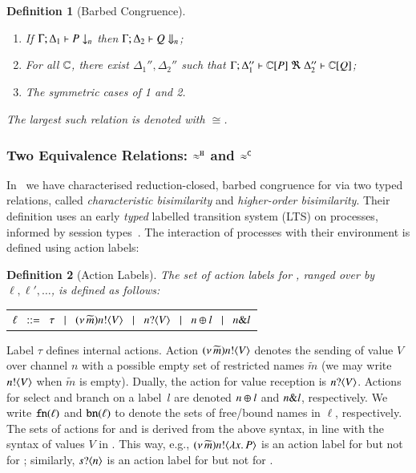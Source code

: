 \documentclass[preprint,11pt]{elsarticle}
\newtheorem{definition}{Definition}[section]
\begin{document}
{\begin{definition}[Barbed Congruence]
\begin{enumerate}[1.]
			\item	If $\Gamma;\Delta_1 \vdash P \downarrow_{n}$ then $\Gamma;\Delta_2 \vdash Q \Downarrow_{n}$; %


		\item	For all ${\mathbb{C}}$, there exist $\Delta_1'',\Delta_2''$ such that  $\horel{\Gamma}{\Delta_1''}{\context{\C}{P}}{\ \Re\ }{\Delta_2''}{\context{\C}{Q}}$;
		                      \item	The symmetric cases of 1 and 2.                
	\end{enumerate}
	The largest such relation is denoted with $\cong$.
\end{definition}

{
\subsubsection{Two Equivalence Relations: $\approx^\mathtt{H}$ and $\approx^\mathtt{C}$}\label{ss:equiv}
In~\cite{characteristic_bis,KouzapasPY17} we have characterised
reduction-closed, barbed congruence for \HOp
via two typed relations, called
{\em characteristic bisimilarity}
and 
\emph{higher-order bisimilarity}.
Their definition 
uses an early \emph{typed}
labelled transition system (LTS) on processes, informed by session
types~\cite{KY2015}. 
The interaction of processes with their environment is defined using action labels:
%
\begin{definition}[Action Labels]\label{d:labels}
The set of action labels for \HOp, ranged over by $\ell, \ell', \ldots$, is defined as follows:
\begin{center}
	\begin{tabular}{l}
		$\ell
			\;\;::=\;\;  \tau 
			\;\;\;|\;\;\;	(\nu\, \widetilde{m}) n ! \langle V \rangle
			\;\;\;|\;\;\;	n ? \langle V \rangle 
			\;\;\;|\;\;\;	n \oplus l 
			\;\;\;|\;\;\;	n \& l$
	\end{tabular}
\end{center}
\end{definition}
%
\noi 
Label $\tau$ defines internal actions.
Action
$(\nu\, \widetilde{m}) n ! \langle V \rangle$
denotes the sending of value $V$
over channel $n$ with a possible empty set of restricted names
$\widetilde{m}$ 
(we may write $n ! \langle V \rangle$ when $\widetilde{m}$ is empty).
Dually, the action for value reception is 
$n ? \langle V \rangle$.
Actions for select and branch on
a label~$l$ are denoted $n \oplus l$ and $n \& l$, respectively.
We write $\mathtt{fn}(\ell)$ and $\mathtt{bn}(\ell)$ to denote the
sets of free/bound names in $\ell$, respectively.
The sets of actions for \HO and \sessp is derived from the above syntax, in line with the syntax of values $V$ in .
This way, e.g., $(\nu\, \widetilde{m}) n ! \langle \lambda x.\,P \rangle$ is an action label for \HO but not for \sessp;
similarly, $s ? \langle n \rangle$ is an action label for \sessp but not for \HO.

}}
\end{document}
